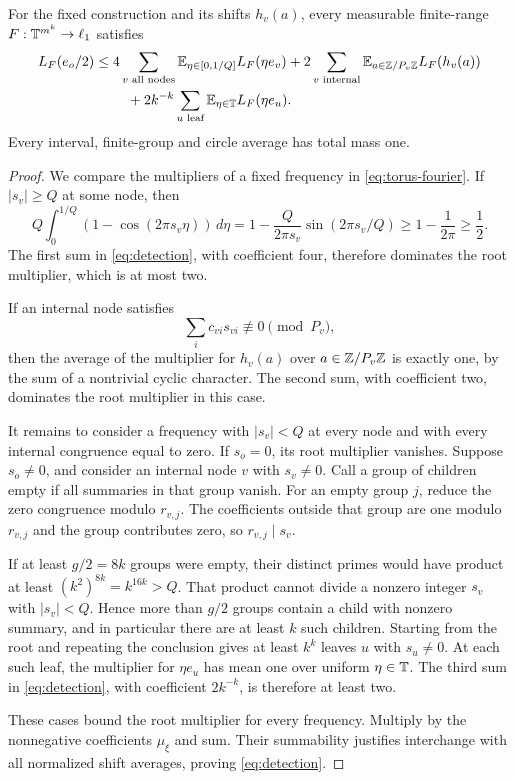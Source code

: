 \begin{lemma}\label{lem:detection}
For the fixed construction and its shifts $h_v(a)$, every measurable
finite-range $F:\mathbb T^{m^k}\to\ell_1$ satisfies
\begin{align}
 L_F(e_o/2)\leq{}&
 4\sum_{v\text{ all nodes}}
 \mathbb E_{\eta\in[0,1/Q]}L_F(\eta e_v)
 +2\sum_{v\text{ internal}}
 \mathbb E_{a\in\mathbb Z/P_v\mathbb Z}L_F(h_v(a))\notag\\
 &\quad+2k^{-k}\sum_{u\text{ leaf}}
 \mathbb E_{\eta\in\mathbb T}L_F(\eta e_u).
 \label{eq:detection}
\end{align}
Every interval, finite-group and circle average has total mass one.
\end{lemma}
\begin{proof}
We compare the multipliers of a fixed frequency in
\eqref{eq:torus-fourier}. If $|s_v|\geq Q$ at some node, then
\[
 Q\int_0^{1/Q}(1-\cos(2\pi s_v\eta))\,d\eta
 =1-\frac{Q}{2\pi s_v}\sin(2\pi s_v/Q)
 \geq1-\frac1{2\pi}\geq\frac12.
\]
The first sum in \eqref{eq:detection}, with coefficient four, therefore
dominates the root multiplier, which is at most two.

If an internal node satisfies
\begin{equation}\label{eq:nonzero-congruence}
 \sum_i c_{vi}s_{vi}\not\equiv0\pmod{P_v},
\end{equation}
then the average of the multiplier for $h_v(a)$ over
$a\in\mathbb Z/P_v\mathbb Z$ is exactly one, by the sum of a nontrivial cyclic
character. The second sum, with coefficient two, dominates the root
multiplier in this case.

It remains to consider a frequency with $|s_v|<Q$ at every node and
with every internal congruence equal to zero. If $s_o=0$, its root
multiplier vanishes. Suppose $s_o\ne0$, and consider an internal node
$v$ with $s_v\ne0$. Call a group of children empty if all summaries
in that group vanish. For an empty group $j$, reduce the zero
congruence modulo $r_{v,j}$. The coefficients outside that group are
one modulo $r_{v,j}$ and the group contributes zero, so
$r_{v,j}\mid s_v$.

If at least $g/2=8k$ groups were empty, their distinct primes would
have product at least
$(k^2)^{8k}=k^{16k}>Q$. That product cannot divide a nonzero integer
$s_v$ with $|s_v|<Q$. Hence more than $g/2$ groups contain a child
with nonzero summary, and in particular there are at least $k$ such
children. Starting from the root and repeating the conclusion gives
at least $k^k$ leaves $u$ with $s_u\ne0$. At each such leaf, the
multiplier for $\eta e_u$ has mean one over uniform $\eta\in\mathbb T$.
The third sum in \eqref{eq:detection}, with coefficient $2k^{-k}$,
is therefore at least two.

These cases bound the root multiplier for every frequency. Multiply
by the nonnegative coefficients $\mu_\xi$ and sum. Their summability
justifies interchange with all normalized shift averages, proving
\eqref{eq:detection}.
\end{proof}

